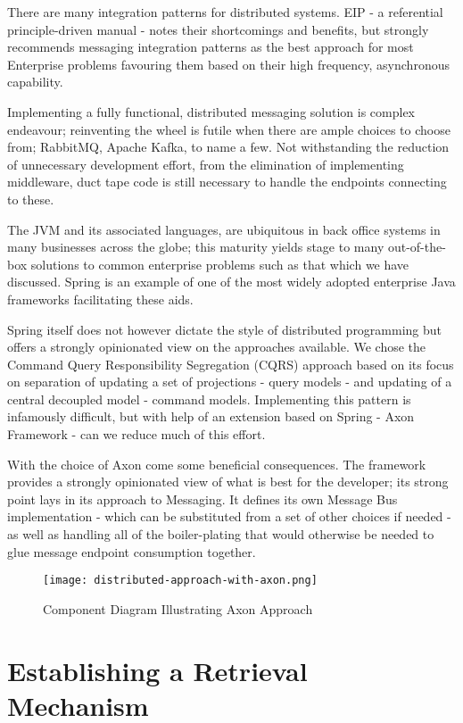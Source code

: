 There are many integration patterns for distributed systems. EIP - a referential principle-driven manual - notes their shortcomings and benefits, but strongly recommends messaging integration patterns as the best approach for most Enterprise problems favouring them based on their high frequency, asynchronous capability.

Implementing a fully functional, distributed messaging solution is complex endeavour; reinventing the wheel is futile when there are ample choices to choose from; RabbitMQ, Apache Kafka, to name a few. Not withstanding the reduction of unnecessary development effort, from the elimination of implementing middleware, duct tape code is still necessary to handle the endpoints connecting to these.

The JVM and its associated languages, are ubiquitous in back office systems in many businesses across the globe; this maturity yields stage to many out-of-the-box solutions to common enterprise problems such as that which we have discussed. Spring is an example of one of the most widely adopted enterprise Java frameworks facilitating these aids.

Spring itself does not however dictate the style of distributed programming but offers a strongly opinionated view on the approaches available. We chose the Command Query Responsibility Segregation (CQRS) approach based on its focus on separation of updating a set of projections - query models - and updating of a central decoupled model - command models. Implementing this pattern is infamously difficult, but with help of an extension based on Spring - Axon Framework - can we reduce much of this effort.  

With the choice of Axon come some beneficial consequences. The framework provides a strongly opinionated view of what is best for the developer; its strong point lays in its approach to Messaging. It defines its own Message Bus implementation - which can be substituted from a set of other choices if needed - as well as handling all of the boiler-plating that would otherwise be needed to glue message endpoint consumption together.

\begin{figure}[h!]
	\centering
	\texttt{[image: distributed-approach-with-axon.png]}
	\caption{Component Diagram Illustrating Axon Approach}
	\label{fig:distributed-approach}
\end{figure}

\section{Establishing a Retrieval Mechanism}


